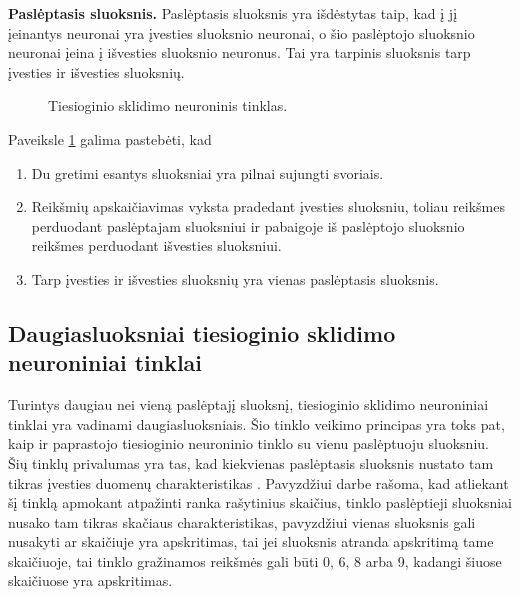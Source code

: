 \textbf{Paslėptasis sluoksnis.} Paslėptasis sluoksnis yra išdėstytas taip, kad į jį įeinantys neuronai yra įvesties sluoksnio neuronai, o šio paslėptojo sluoksnio neuronai įeina į išvesties sluoksnio neuronus. Tai yra tarpinis sluoksnis tarp įvesties ir išvesties sluoksnių. \cite{Sibanjan2017}

\begin{figure}[h!]
  \centering
{}
\caption{Tiesioginio sklidimo neuroninis tinklas.}
\label{fig:feedforfff}
\end{figure}

Paveiksle \ref{fig:feedforfff} galima pastebėti, kad
\begin{enumerate}
  \item Du gretimi esantys sluoksniai yra pilnai sujungti svoriais.
  \item Reikšmių apskaičiavimas vyksta pradedant įvesties sluoksniu, toliau reikšmes perduodant paslėptajam sluoksniui ir pabaigoje iš paslėptojo sluoksnio reikšmes perduodant išvesties sluoksniui.
  \item Tarp įvesties ir išvesties sluoksnių yra vienas paslėptasis sluoksnis.
\end{enumerate}


\subsection{Daugiasluoksniai tiesioginio sklidimo neuroniniai tinklai}

Turintys daugiau nei vieną paslėptajį sluoksnį, tiesioginio sklidimo neuroniniai tinklai yra vadinami daugiasluoksniais. Šio tinklo veikimo principas yra toks pat, kaip ir paprastojo tiesioginio neuroninio tinklo su vienu paslėptuoju sluoksniu. Šių tinklų privalumas yra tas, kad kiekvienas paslėptasis sluoksnis nustato tam tikras įvesties duomenų charakteristikas \cite{Mirjalili2019}. Pavyzdžiui \cite{Deividas2018} darbe rašoma, kad atliekant šį tinklą apmokant atpažinti ranka rašytinius skaičius, tinklo paslėptieji sluoksniai nusako tam tikras skačiaus charakteristikas, pavyzdžiui vienas sluoksnis gali nusakyti ar skaičiuje yra apskritimas, tai jei sluoksnis atranda apskritimą tame skaičiuoje, tai tinklo gražinamos reikšmės gali būti 0, 6, 8 arba 9, kadangi šiuose skaičiuose yra apskritimas.

